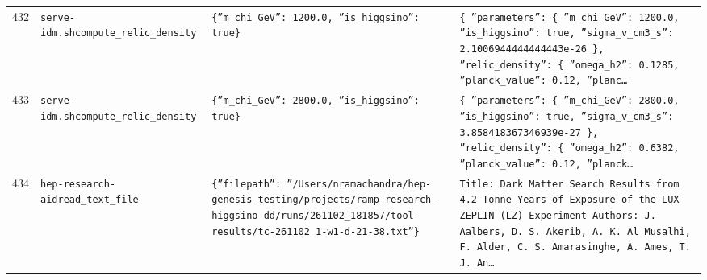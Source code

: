 \documentclass[11pt,a4paper]{article}
\begin{document}
\begin{longtable}{@{}p{}p{}p{}p{}@{}}
432 & \texttt{serve-idm.sh}\newline\texttt{compute\_\allowbreak{}relic\_\allowbreak{}density} & \texttt{\{''m\_\allowbreak{}chi\_\allowbreak{}GeV'':\allowbreak{} 1200.0,\allowbreak{} ''is\_\allowbreak{}higgsino'':\allowbreak{} true\}\allowbreak{}} & \texttt{\{   ''parameters'':\allowbreak{} \{     ''m\_\allowbreak{}chi\_\allowbreak{}GeV'':\allowbreak{} 1200.0,\allowbreak{}     ''is\_\allowbreak{}higgsino'':\allowbreak{} true,\allowbreak{}     ''sigma\_\allowbreak{}v\_\allowbreak{}cm3\_\allowbreak{}s'':\allowbreak{} 2.1006944444444443e-26   \}\allowbreak{},\allowbreak{}   ''relic\_\allowbreak{}density'':\allowbreak{} \{     ''omega\_\allowbreak{}h2'':\allowbreak{} 0.1285,\allowbreak{}     ''planck\_\allowbreak{}value'':\allowbreak{} 0.12,\allowbreak{}     ''planc\ldots{}\allowbreak{}} \\
433 & \texttt{serve-idm.sh}\newline\texttt{compute\_\allowbreak{}relic\_\allowbreak{}density} & \texttt{\{''m\_\allowbreak{}chi\_\allowbreak{}GeV'':\allowbreak{} 2800.0,\allowbreak{} ''is\_\allowbreak{}higgsino'':\allowbreak{} true\}\allowbreak{}} & \texttt{\{   ''parameters'':\allowbreak{} \{     ''m\_\allowbreak{}chi\_\allowbreak{}GeV'':\allowbreak{} 2800.0,\allowbreak{}     ''is\_\allowbreak{}higgsino'':\allowbreak{} true,\allowbreak{}     ''sigma\_\allowbreak{}v\_\allowbreak{}cm3\_\allowbreak{}s'':\allowbreak{} 3.858418367346939e-27   \}\allowbreak{},\allowbreak{}   ''relic\_\allowbreak{}density'':\allowbreak{} \{     ''omega\_\allowbreak{}h2'':\allowbreak{} 0.6382,\allowbreak{}     ''planck\_\allowbreak{}value'':\allowbreak{} 0.12,\allowbreak{}     ''planck\ldots{}\allowbreak{}} \\
434 & \texttt{hep-research-aid}\newline\texttt{read\_\allowbreak{}text\_\allowbreak{}file} & \texttt{\{''filepath'':\allowbreak{} ''/\allowbreak{}Users/\allowbreak{}nramachandra/\allowbreak{}hep-genesis-testing/\allowbreak{}projects/\allowbreak{}ramp-research-higgsino-dd/\allowbreak{}runs/\allowbreak{}261102\_\allowbreak{}181857/\allowbreak{}tool-results/\allowbreak{}tc-261102\_\allowbreak{}1-w1-d-21-38.txt''\}\allowbreak{}} & \texttt{Title:\allowbreak{} Dark Matter Search Results from 4.2 Tonne-Years of Exposure of the LUX-ZEPLIN (LZ)\allowbreak{} Experiment Authors:\allowbreak{} J. Aalbers,\allowbreak{} D. S. Akerib,\allowbreak{} A. K. Al Musalhi,\allowbreak{} F. Alder,\allowbreak{} C. S. Amarasinghe,\allowbreak{} A. Ames,\allowbreak{} T. J. An\ldots{}\allowbreak{}} \\

\end{longtable}
\end{document}
